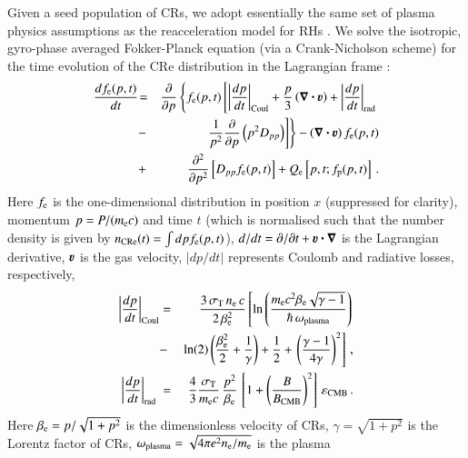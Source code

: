 \documentclass[fleqn,usenatbib,useAMS]{mnras}
\newcommand{\bcdot}{\ensuremath{%
  \mathchoice%
   {\mskip\thinmuskip\lower0.2ex\hbox{\scalebox{1.5}{$\cdot$}}\mskip\thinmuskip}}%
   {\mskip\thinmuskip\lower0.2ex\hbox{\scalebox{1.5}{$\cdot$}}\mskip\thinmuskip}%
   {\lower0.3ex\hbox{\scalebox{1.2}{$\cdot$}}}%
   {\lower0.3ex\hbox{\scalebox{1.2}{$\cdot$}}}%
}
\newcommand{\bvel}{\ensuremath{\boldsymbol{\varv}}}
\newcommand{\bnabla}{\ensuremath{\boldsymbol{\nabla}}}
\newcommand{\eps}{\varepsilon}
\begin{document}
Given a seed population of CRs, we adopt essentially the same set of
plasma physics assumptions as the reacceleration model for RHs
\citep{brunetti07,brunetti11}. We solve the isotropic, gyro-phase
averaged Fokker-Planck equation (via a Crank-Nicholson scheme) for the
time evolution of the CRe distribution in the Lagrangian frame
\citep{brunetti07,brunetti11}:
\begin{eqnarray}
{{d f_{\rmn{e}}(p,t)}\over{d t}} &\!=&
\frac{\partial}{\partial p}
\left\{
f_{\rmn{e}}(p,t)\left[
\left|\frac{d p}{d t}\right|_{\rm Coul} 
+ \frac{p}{3}\left(\bnabla\bcdot \bvel\right)
+ \left|\frac{d p}{d t}\right|_{\rm rad}\right.\right.
\nonumber\\
&-& \left.\left.{1\over{p^2}}{{\partial }\over{\partial p}}\left(p^2 D_{pp}\right) 
\right]\right\} - \left(\bnabla\bcdot \bvel\right) f_{\rmn{e}}(p,t)
\nonumber\\
&+& {{\partial^2 }\over{\partial p^2}}
\left[
D_{pp} f_{\rmn{e}}(p,t) \right]+ Q_{\rmn{e}}\left[p,t;f_{\rmn{p}}(p,t)\right]   \, .
\label{elettroni}
\end{eqnarray}
Here $f_{{\mathrm{e}}}$ is the one-dimensional distribution in position $x$
(suppressed for clarity), momentum $p=P/(m_{{\mathrm{e}}} c)$ and time $t$
(which is normalised such that the number density is given by
$n_{{\mathrm{CRe}}}(t)=\int d p f_{{\mathrm{e}}}(p,t)$), $d/d t=\partial/\partial
t+\bvel\bcdot\bnabla$ is the Lagrangian derivative, $\bvel$ is the gas velocity,
$|d p/d t|$ represents Coulomb \citep[Coul,][]{1972Phy....60..145G} and
radiative \citep[rad,][]{1979rpa..book.....R} losses, respectively,
\begin{eqnarray}
   \left|\frac{d p}{d t}\right|_{\rm Coul} &=& \frac{3\,\sigma_\rmn{T}\,n_{\rmn{e}}\,c}{2\, \beta_{\rmn{e}}^2}
  \left[\ln\left(\frac{m_{\rmn{e}} c^2 \beta_{\rmn{e}} \sqrt{\gamma-1}}{\hbar\,\omega_\rmn{plasma}}\right)\right.\nonumber \\
    &-&\ln(2)\left(\frac{\beta_{\rmn{e}}^2}{2}+\frac{1}{\gamma}\right)+\frac{1}{2}+
    \left.\left(\frac{\gamma-1}{4\gamma}\right)^2\right]\,, \\
  \left|\frac{d p}{d t}\right|_{\rm rad~} &=& \frac{4}{3}\frac{\sigma_\rmn{T}}{m_{\rmn{e}}c}\,
  \frac{p^2}{\beta_{\rmn{e}}}\,\left[1+\left(\frac{B}{B_\rmn{CMB}}\right)^2\right]\,\eps_{\rmn{CMB}}\,.
\end{eqnarray}
Here $\beta_{{\mathrm{e}}} = p/\sqrt{1+p^2}$ is the dimensionless velocity of CRs,
$\gamma=\sqrt{1+p^2}$ is the Lorentz factor of CRs,
$\omega_{\mathrm{plasma}} = \sqrt{4\pi e^2 n_{{\mathrm{e}}} / m_{{\mathrm{e}}}}$ is the plasma
\end{document}
